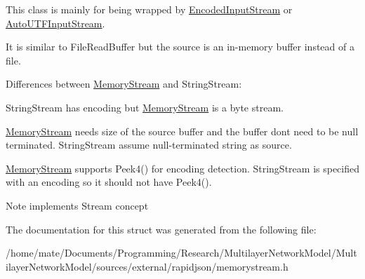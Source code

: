 This class is mainly for being wrapped by \hyperlink{classEncodedInputStream}{Encoded\+Input\+Stream} or \hyperlink{classAutoUTFInputStream}{Auto\+U\+T\+F\+Input\+Stream}.

It is similar to File\+Read\+Buffer but the source is an in-\/memory buffer instead of a file.

Differences between \hyperlink{structMemoryStream}{Memory\+Stream} and String\+Stream\+:
\begin{DoxyEnumerate}
\item String\+Stream has encoding but \hyperlink{structMemoryStream}{Memory\+Stream} is a byte stream.
\item \hyperlink{structMemoryStream}{Memory\+Stream} needs size of the source buffer and the buffer don\textquotesingle{}t need to be null terminated. String\+Stream assume null-\/terminated string as source.
\item \hyperlink{structMemoryStream}{Memory\+Stream} supports Peek4() for encoding detection. String\+Stream is specified with an encoding so it should not have Peek4(). \begin{DoxyNote}{Note}
implements Stream concept 
\end{DoxyNote}

\end{DoxyEnumerate}

The documentation for this struct was generated from the following file\+:\begin{DoxyCompactItemize}
\item 
/home/mate/\+Documents/\+Programming/\+Research/\+Multilayer\+Network\+Model/\+Multilayer\+Network\+Model/sources/external/rapidjson/memorystream.\+h\end{DoxyCompactItemize}
